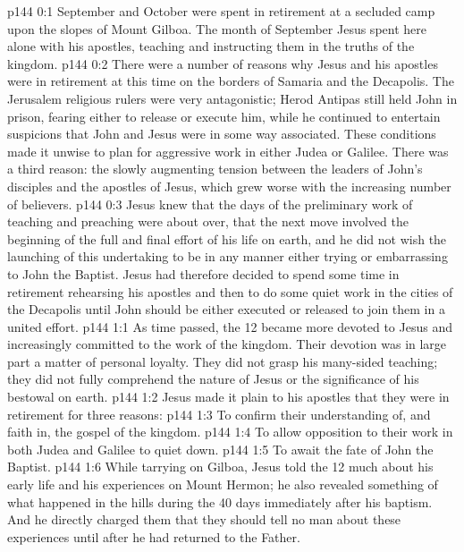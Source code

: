 \author{Midwayer Commission}
\vs p144 0:1 September and October were spent in retirement at a secluded camp upon the slopes of Mount Gilboa. The month of September Jesus spent here alone with his apostles, teaching and instructing them in the truths of the kingdom.
\vs p144 0:2 There were a number of reasons why Jesus and his apostles were in retirement at this time on the borders of Samaria and the Decapolis. The Jerusalem religious rulers were very antagonistic; Herod Antipas still held John in prison, fearing either to release or execute him, while he continued to entertain suspicions that John and Jesus were in some way associated. These conditions made it unwise to plan for aggressive work in either Judea or Galilee. There was a third reason: the slowly augmenting tension between the leaders of John’s disciples and the apostles of Jesus, which grew worse with the increasing number of believers.
\vs p144 0:3 Jesus knew that the days of the preliminary work of teaching and preaching were about over, that the next move involved the beginning of the full and final effort of his life on earth, and he did not wish the launching of this undertaking to be in any manner either trying or embarrassing to John the Baptist. Jesus had therefore decided to spend some time in retirement rehearsing his apostles and then to do some quiet work in the cities of the Decapolis until John should be either executed or released to join them in a united effort.
\vs p144 1:1 As time passed, the 12 became more devoted to Jesus and increasingly committed to the work of the kingdom. Their devotion was in large part a matter of personal loyalty. They did not grasp his many\hyp{}sided teaching; they did not fully comprehend the nature of Jesus or the significance of his bestowal on earth.
\vs p144 1:2 Jesus made it plain to his apostles that they were in retirement for three reasons:
\vs p144 1:3 \bibnobreakspace To confirm their understanding of, and faith in, the gospel of the kingdom.
\vs p144 1:4 \bibnobreakspace To allow opposition to their work in both Judea and Galilee to quiet down.
\vs p144 1:5 \bibnobreakspace To await the fate of John the Baptist.
\vs p144 1:6 \pc While tarrying on Gilboa, Jesus told the 12 much about his early life and his experiences on Mount Hermon; he also revealed something of what happened in the hills during the 40 days immediately after his baptism. And he directly charged them that they should tell no man about these experiences until after he had returned to the Father.
